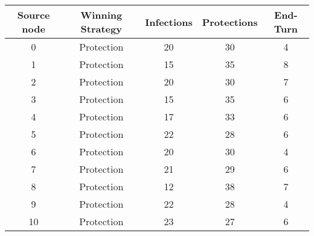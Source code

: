 \documentclass[results.tex]{subfiles}
\begin{document}
    \begin{center}
        \begin{tabular}{| c || c | c | c | c |}
            \hline
            {\bfseries Source node} & {\bfseries Winning Strategy} & {\bfseries Infections} & {\bfseries Protections}
            & {\bfseries End-Turn}
            \\  %
            \hline\hline
            0                       & Protection                   & 20                     & 30                      & 4                    \\
            \hline
            1                       & Protection                   & 15                     & 35                      & 8                    \\
            \hline
            2                       & Protection                   & 20                     & 30                      & 7                    \\
            \hline
            3                       & Protection                   & 15                     & 35                      & 6                    \\
            \hline
            4                       & Protection                   & 17                     & 33                      & 6                    \\
            \hline
            5                       & Protection                   & 22                     & 28                      & 6                    \\
            \hline
            6                       & Protection                   & 20                     & 30                      & 4                    \\
            \hline
            7                       & Protection                   & 21                     & 29                      & 6                    \\
            \hline
            8                       & Protection                   & 12                     & 38                      & 7                    \\
            \hline
            9                       & Protection                   & 22                     & 28                      & 4                    \\
            \hline
            10                      & Protection                   & 23                     & 27                      & 6                    \\

\end{tabular}
\end{center}
\end{document}
